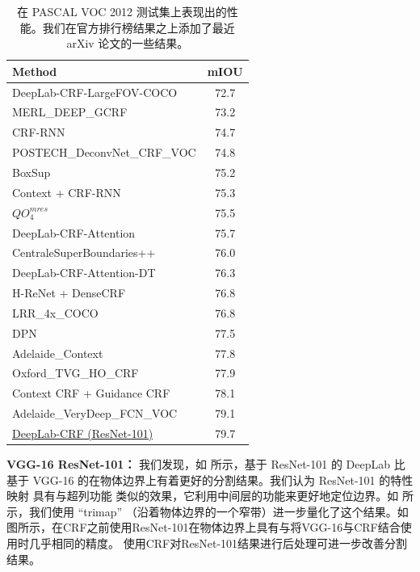 \begin{table}[!th]
  \centering
  \addtolength{\tabcolsep}{2.5pt}
  \begin{tabular}{l | c}
    \toprule[0.2 em]
    {\bf Method} & {\bf mIOU} \\
    \toprule[0.2 em]
    DeepLab-CRF-LargeFOV-COCO \cite{papandreou2015weakly} & 72.7\\
    MERL\_DEEP\_GCRF \cite{Vemulapalli2016Gaussian} & 73.2 \\
    CRF-RNN \cite{zheng2015conditional} & 74.7 \\
    POSTECH\_DeconvNet\_CRF\_VOC \cite{noh2015learning} & 74.8 \\
    BoxSup \cite{dai2015boxsup} & 75.2 \\
    Context + CRF-RNN \cite{yu2015multi} & 75.3 \\
    $QO_4^{mres}$ \cite{chandra2016fast} & 75.5 \\
    DeepLab-CRF-Attention \cite{chen2015attention} & 75.7 \\
    CentraleSuperBoundaries++ \cite{kokkinos2016pushing} & 76.0 \\
    DeepLab-CRF-Attention-DT  \cite{chen2015semantic} & 76.3 \\
    H-ReNet + DenseCRF \cite{yan2016combining} & 76.8 \\
    LRR\_4x\_COCO \cite{ghiasi2016laplacian} & 76.8 \\
    DPN \cite{liu2015semantic} & 77.5 \\
    Adelaide\_Context \cite{lin2015efficient} & 77.8 \\
    Oxford\_TVG\_HO\_CRF \cite{arnab2015higher} & 77.9 \\
    Context CRF + Guidance CRF \cite{Shen2016Fast} & 78.1 \\
    Adelaide\_VeryDeep\_FCN\_VOC \cite{wu2016bridging} & 79.1 \\
    \midrule
    \href{http://host.robots.ox.ac.uk:8080/anonymous/FLHY8R.html}{DeepLab-CRF (ResNet-101)} & 79.7 \\
    \bottomrule[0.1 em]
  \end{tabular}
  \caption{在 PASCAL VOC 2012 测试集上表现出的性能。我们在官方排行榜结果之上添加了最近 arXiv 论文的一些结果。}
  \label{tab:res_testset}
\end{table}

\textbf{VGG-16 \vs ResNet-101：}
我们发现，如  所示，基于 ResNet-101 \cite{he2015deep} 的 DeepLab 比基于 VGG-16 的在物体边界上有着更好的分割结果。我们认为 ResNet-101 的特性映射 \cite{he2016identity} 具有与超列功能 \cite{hariharan2014hypercolumns} 类似的效果，它利用中间层的功能来更好地定位边界。如  所示，我们使用 ``trimap'' \cite{kohli2009robust, krahenbuhl2011efficient}（沿着物体边界的一个窄带）进一步量化了这个结果。如图所示，在CRF之前使用ResNet-101在物体边界上具有与将VGG-16与CRF结合使用时几乎相同的精度。 使用CRF对ResNet-101结果进行后处理可进一步改善分割结果。


